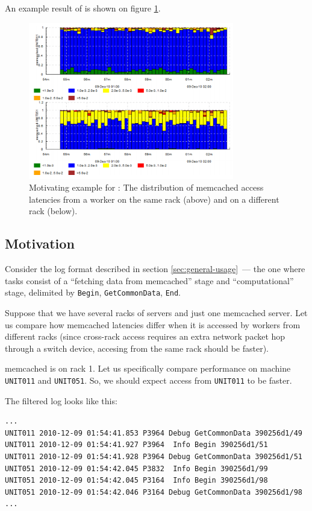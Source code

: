 \documentclass{article}
\begin{document}
An example result of \timeplot{} is shown on figure \ref{fig:tplot-motivating-example}.

\begin{figure}[p]
\center
\includegraphics[width=0.8\textwidth]{pics/tplot/tplot-motivating-example.png}
\caption{Motivating example for \timeplot{}: The distribution of memcached access latencies from a worker on the same rack (above) and on a different rack (below).}
\label{fig:tplot-motivating-example}
\end{figure}

\subsection{Motivation}

Consider the log format described in section \ref{sec:general-usage}~--- the one where tasks consist of a ``fetching data from memcached'' stage and ``computational'' stage, delimited by \verb|Begin|, \verb|GetCommonData|, \verb|End|.

Suppose that we have several racks of servers and just one memcached server. Let us compare how memcached latencies differ when it is accessed by workers from different racks (since cross-rack access requires an extra network packet hop through a switch device, accesing from the same rack should be faster).

memcached is on rack 1. Let us specifically compare performance on machine \verb|UNIT011| and \verb|UNIT051|. So, we should expect access from \verb|UNIT011| to be faster.

The filtered log looks like this:
\begin{verbatim}
...
UNIT011 2010-12-09 01:54:41.853 P3964 Debug GetCommonData 390256d1/49
UNIT011 2010-12-09 01:54:41.927 P3964  Info Begin 390256d1/51
UNIT011 2010-12-09 01:54:41.928 P3964 Debug GetCommonData 390256d1/51
UNIT051 2010-12-09 01:54:42.045 P3832  Info Begin 390256d1/99
UNIT051 2010-12-09 01:54:42.045 P3164  Info Begin 390256d1/98
UNIT051 2010-12-09 01:54:42.046 P3164 Debug GetCommonData 390256d1/98
...
\end{verbatim}
\end{document}
